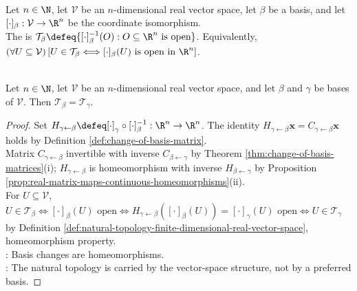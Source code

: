 \begin{definition} \label{def:natural-topology-finite-dimensional-real-vector-space} \\
Let $n\in\N$, let $\mathcal{V}$ be an $n$-dimensional real vector space, let $\beta$ be a basis, and let $[\cdot]_{\beta}:\mathcal{V}\to\R^n$ be the coordinate isomorphism.\\
The  is $\mathcal{T}_{\beta}\defeq\{[\cdot]_{\beta}^{-1}(O):O\subseteq\R^n\text{ is open}\}$. Equivalently, $(\forall U\subseteq\mathcal{V})\,[U\in\mathcal{T}_{\beta}\Longleftrightarrow[\cdot]_{\beta}(U)\text{ is open in }\R^n]$.
\end{definition}

\begin{proposition} \label{prop:natural-topology-independent-of-basis} \\
Let $n\in\N$, let $\mathcal{V}$ be an $n$-dimensional real vector space, and let $\beta$ and $\gamma$ be bases of $\mathcal{V}$. Then $\mathcal{T}_{\beta}=\mathcal{T}_{\gamma}$.
\begin{proof}
Set $H_{\gamma\leftarrow\beta}\defeq[\cdot]_{\gamma}\circ[\cdot]_{\beta}^{-1}:\R^n\to\R^n$. The identity $H_{\gamma\leftarrow\beta}\mathbf{x}=C_{\gamma\leftarrow\beta}\mathbf{x}$ holds by Definition \ref{def:change-of-basis-matrix}.\\
Matrix $C_{\gamma\leftarrow\beta}$ invertible with inverse $C_{\beta\leftarrow\gamma}$ by Theorem \ref{thm:change-of-basis-matrices}(i); $H_{\gamma\leftarrow\beta}$ is  homeomorphism with inverse $H_{\beta\leftarrow\gamma}$ by Proposition \ref{prop:real-matrix-maps-continuous-homeomorphisms}(ii).\\
For $U\subseteq\mathcal{V}$, $U\in\mathcal{T}_{\beta}\Longleftrightarrow[\cdot]_{\beta}(U)\text{ open}\Longleftrightarrow H_{\gamma\leftarrow\beta}([\cdot]_{\beta}(U))=[\cdot]_{\gamma}(U)\text{ open}\Longleftrightarrow U\in\mathcal{T}_{\gamma}$ by Definition \ref{def:natural-topology-finite-dimensional-real-vector-space},  homeomorphism property.\\
: Basis changes are homeomorphisms.\\
: The natural topology is carried by the vector-space structure, not by a preferred basis.
\end{proof}
\end{proposition}

